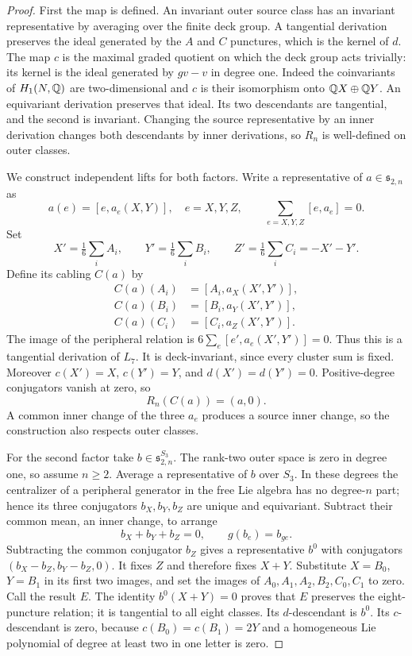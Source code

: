 \begin{proof}
First the map is defined. An invariant outer source class has an
invariant representative by averaging over the finite deck group.
A tangential derivation preserves the ideal generated by the $A$ and
$C$ punctures, which is the kernel of $d$. The map $c$ is the maximal
graded quotient on which the deck group acts trivially: its kernel
is the ideal generated by $gv-v$ in degree one. Indeed the
coinvariants of $H_1(N,\mathbb Q)$ are two-dimensional and $c$ is their
isomorphism onto $\mathbb Q X\oplus\mathbb Q Y$. An equivariant derivation
preserves that ideal. Its two descendants are tangential, and the
second is invariant. Changing the source representative by an inner
derivation changes both descendants by inner derivations, so $R_n$
is well-defined on outer classes.

We construct independent lifts for both factors. Write a representative
of $a\in\mathfrak s_{2,n}$ as
\[
 a(e)=[e,a_e(X,Y)],\quad e=X,Y,Z,\qquad
 \sum_{e=X,Y,Z}[e,a_e]=0.
\]
Set
\[
 X'=\tfrac16\sum_iA_i,\qquad
 Y'=\tfrac16\sum_iB_i,\qquad
 Z'=\tfrac16\sum_iC_i=-X'-Y'.
\]
Define its cabling $C(a)$ by
\[
 \begin{aligned}
 C(a)(A_i)&=[A_i,a_X(X',Y')],\\
 C(a)(B_i)&=[B_i,a_Y(X',Y')],\\
 C(a)(C_i)&=[C_i,a_Z(X',Y')].
 \end{aligned}
\]
The image of the peripheral relation is
$6\sum_e[e',a_e(X',Y')]=0$. Thus this is a tangential derivation of
$L_7$. It is deck-invariant, since every cluster sum is fixed.
Moreover $c(X')=X$, $c(Y')=Y$, and $d(X')=d(Y')=0$. Positive-degree
conjugators vanish at zero, so
\[
                 R_n(C(a))=(a,0).
\]
A common inner change of the three $a_e$ produces a source inner
change, so the construction also respects outer classes.

For the second factor take $b\in\mathfrak s_{2,n}^{S_3}$. The
rank-two outer space is zero in degree one, so assume $n\ge2$.
Average a representative of $b$ over $S_3$. In these degrees the
centralizer of a peripheral generator in the free Lie algebra has
no degree-$n$ part; hence its three conjugators $b_X,b_Y,b_Z$ are
unique and equivariant. Subtract their common mean, an inner change,
to arrange
\[
 b_X+b_Y+b_Z=0,\qquad g(b_e)=b_{ge}.
\]
Subtracting the common conjugator $b_Z$ gives a representative $b^0$
with conjugators $(b_X-b_Z,b_Y-b_Z,0)$. It fixes $Z$ and therefore
fixes $X+Y$. Substitute $X=B_0$, $Y=B_1$ in its first two images,
and set the images of $A_0,A_1,A_2,B_2,C_0,C_1$ to zero. Call the
result $E$. The identity $b^0(X+Y)=0$ proves that $E$ preserves the
eight-puncture relation; it is tangential to all eight classes.
Its $d$-descendant is $b^0$. Its $c$-descendant is zero, because
$c(B_0)=c(B_1)=2Y$ and a homogeneous Lie polynomial of degree at
least two in one letter is zero.


\end{proof}
